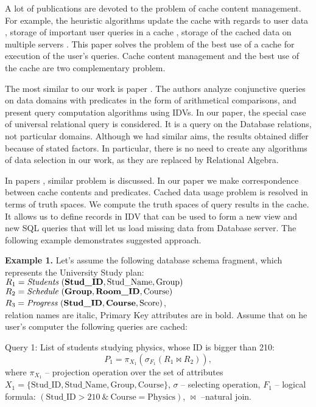 \documentclass[prodmode,acmtods]{acmsmall} %
\begin{document}
A lot of publications are devoted to the problem of cache content management.
For example, the heuristic algorithms update the cache with regards to user data
\cite{chang}, storage of important user queries in a cache
\cite{baralis}, storage of the cached data on multiple servers \cite{kalnis}.
This paper solves the problem of the best use of a cache for execution of the
user's queries. Cache content management and the best use of the cache are two
complementary problem.

The most similar to our work is paper \cite{Afrati06}. The authors analyze
conjunctive queries on data domains with predicates in the form of arithmetical
comparisons, and present query computation algorithms using IDVs. In our paper,
the special case of universal relational query is considered. It is a query on
the Database relations, not particular domains. Although we had similar aims,
the results obtained differ because of stated factors. In particular, there is
no need to create any algorithms of data selection in our work, as they are
replaced by Relational Algebra.

In papers \cite{Keller96}, \cite{shim} similar problem is discussed. In our paper we
make correspondence between cache contents and predicates. Cached data usage
problem is resolved in terms of truth spaces. We compute the truth spaces of
query results in the cache. It allows us to define records in IDV that can be
used to form a new view and new SQL queries that will let us load missing data
from Database server. The following example demonstrates suggested approach.

{\bf Example 1.} Let's assume the following database schema fragment, which
represents the University Study plan:\\
$R_1 =\mbox{\it Students}\ (\mbox{\bf Stud\_ID}, \mbox{Stud\_Name},
\mbox{Group})$\\
$R_2 =\mbox{\it Schedule}\ (\mbox{\bf Group}, \mbox{\bf Room\_ID},
\mbox{Course})$\\
$R_3 =\mbox{\it Progress}\ (\mbox{\bf Stud\_ID}, \mbox{\bf Course},
\mbox{Score})$,\\
relation names are italic, Primary Key attributes are in bold. Assume that on 
he user's computer the following queries are cached:

Query 1: List of students studying physics, whose ID is bigger than 210:
$$P_1 = \pi_{X_1}(\sigma_{F_1} (R_1 \Join R_2)),$$
where $\pi_{X_1}$ -- projection operation over the set of attributes
$X_1 = \{\text{Stud\_ID}, \text{Stud\_Name}, \text{Group}, \text{Course}\}$,
$\sigma$ -- selecting operation,
$F_1$ -- logical formula: $(\text{Stud\_ID} > 210\ \&\ \text{Course} =
\text{Physics})$, $\Join$ --natural join.
\end{document}
